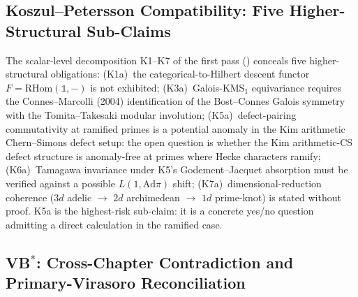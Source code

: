 \subsection{Koszul--Petersson Compatibility: Five Higher-Structural Sub-Claims}

The scalar-level decomposition K1--K7 of the first pass
() conceals five higher-structural
obligations:
(K1a)~the categorical-to-Hilbert descent functor
\(F=\mathrm{RHom}(\mathbb{1},-)\) is not exhibited;
(K3a)~Galois-KMS\({}_{1}\) equivariance requires the Connes--Marcolli
(2004) identification of the Bost--Connes Galois symmetry with the
Tomita--Takesaki modular involution;
(K5a)~defect-pairing commutativity at ramified primes is a potential
anomaly in the Kim arithmetic Chern--Simons defect setup: the open
question is whether the Kim arithmetic-CS defect structure is
anomaly-free at primes where Hecke characters ramify;
(K6a)~Tamagawa invariance under K5's Godement--Jacquet absorption
must be verified against a possible \(L(1,\mathrm{Ad}\pi)\) shift;
(K7a)~dimensional-reduction coherence
(\(3d\) adelic \(\to\) \(2d\) archimedean \(\to\) \(1d\) prime-knot)
is stated without proof.
K5a is the highest-risk sub-claim: it is a concrete yes/no question
admitting a direct calculation in the ramified case.

\subsection{\texorpdfstring{VB\(^{*}\)}{VB*}: Cross-Chapter Contradiction and Primary-Virasoro Reconciliation}

